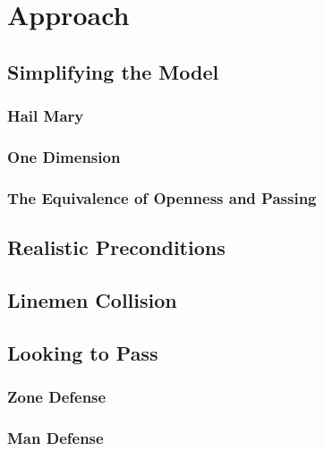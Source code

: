 
\section{Approach}

\blindtext

\subsection{Simplifying the Model}

\blindtext

\subsubsection{Hail Mary}

\blindtext

\subsubsection{One Dimension}

\blindtext

\subsubsection{The Equivalence of Openness and Passing}

\blindtext

\subsection{Realistic Preconditions}

\blindtext

\subsection{Linemen Collision}

\blindtext

\subsection{Looking to Pass}

\blindtext

\subsubsection{Zone Defense}

\blindtext

\subsubsection{Man Defense}

\blindtext